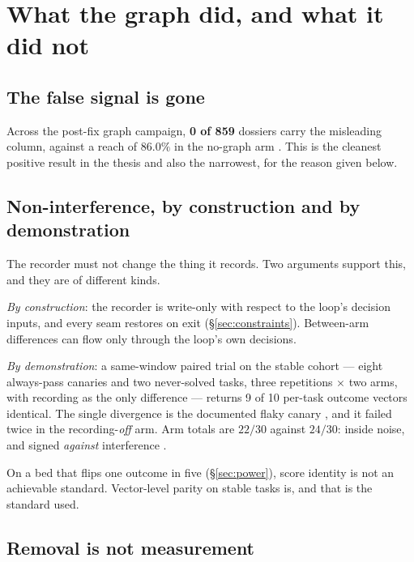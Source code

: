 \section{What the graph did, and what it did not}
\label{sec:what-graph-did}

\subsection*{The false signal is gone}

Across the post-fix graph campaign, \textbf{0 of 859} dossiers carry the
misleading column, against a reach of $86.0\%$ in the no-graph arm
. This is the cleanest positive result in the thesis and also the
narrowest, for the reason given below.

\subsection*{Non-interference, by construction and by demonstration}

The recorder must not change the thing it records. Two arguments support
this, and they are of different kinds.

\emph{By construction}: the recorder is write-only with respect to the
loop's decision inputs, and every seam restores on exit
(\S\ref{sec:constraints}). Between-arm differences can flow only through
the loop's own decisions.

\emph{By demonstration}: a same-window paired trial on the stable cohort
--- eight always-pass canaries and two never-solved tasks, three
repetitions $\times$ two arms, with recording as the only difference ---
returns 9 of 10 per-task outcome vectors identical. The single divergence
is the documented flaky canary , and it failed twice in the
recording-\emph{off} arm. Arm totals are $22/30$ against $24/30$: inside
noise, and signed \emph{against} interference .

On a bed that flips one outcome in five (\S\ref{sec:power}), score identity
is not an achievable standard. Vector-level parity on stable tasks is, and
that is the standard used.

\subsection*{Removal is not measurement}

